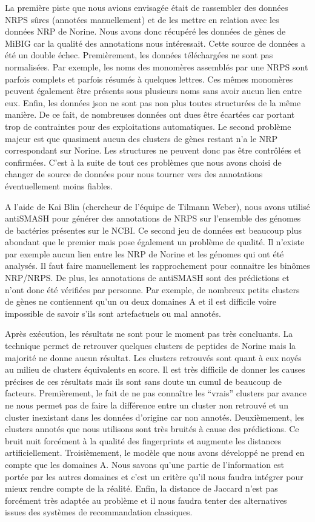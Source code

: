 La première piste que nous avions envisagée était de rassembler des données NRPS sûres (annotées manuellement) et de les mettre en relation avec les données NRP de Norine.
Nous avons donc récupéré les données de gènes de MiBIG car la qualité des annotations nous intéressait.
Cette source de données a été un double échec.
Premièrement, les données téléchargées ne sont pas normalisées.
Par exemple, les noms des monomères assemblés par une NRPS sont parfois complets et parfois résumés à quelques lettres.
Ces mêmes monomères peuvent également être présents sous plusieurs noms sans avoir aucun lien entre eux.
Enfin, les données json ne sont pas non plus toutes structurées de la même manière.
De ce fait, de nombreuses données ont dues être écartées car portant trop de contraintes pour des exploitations automatiques.
Le second problème majeur est que quasiment aucun des clusters de gènes restant n'a le NRP correspondant sur Norine.
Les structures ne peuvent donc pas être contrôlées et confirmées.
C'est à la suite de tout ces problèmes que nous avons choisi de changer de source de données pour nous tourner vers des annotations éventuellement moins fiables.

A l'aide de Kai Blin (chercheur de l'équipe de Tilmann Weber), nous avons utilisé antiSMASH pour générer des annotations de NRPS sur l'ensemble des génomes de bactéries présentes sur le NCBI.
Ce second jeu de données est beaucoup plus abondant que le premier mais pose également un problème de qualité.
Il n'existe par exemple aucun lien entre les NRP de Norine et les génomes qui ont été analysés.
Il faut faire manuellement les rapprochement pour connaitre les binômes NRP/NRPS.
De plus, les annotations de antiSMASH sont des prédictions et n'ont donc été vérifiées par personne.
Par exemple, de nombreux petits clusters de gènes ne contiennent qu'un ou deux domaines A et il est difficile voire impossible de savoir s'ils sont artefactuels ou mal annotés.

Après exécution, les résultats ne sont pour le moment pas très concluants.
La technique permet de retrouver quelques clusters de peptides de Norine mais la majorité ne donne aucun résultat.
Les clusters retrouvés sont quant à eux noyés au milieu de clusters équivalents en score.
Il est très difficile de donner les causes précises de ces résultats mais ils sont sans doute un cumul de beaucoup de facteurs.
Premièrement, le fait de ne pas connaître les ``vrais'' clusters par avance ne nous permet pas de faire la différence entre un cluster non retrouvé et un cluster inexistant dans les données d'origine car non annotés.
Deuxièmement, les clusters annotés que nous utilisons sont très bruités à cause des prédictions.
Ce bruit nuit forcément à la qualité des fingerprints et augmente les distances artificiellement.
Troisièmement, le modèle que nous avons développé ne prend en compte que les domaines A.
Nous savons qu'une partie de l'information est portée par les autres domaines et c'est un critère qu'il nous faudra intégrer pour mieux rendre compte de la réalité.
Enfin, la distance de Jaccard n'est pas forcément très adaptée au problème et il nous faudra tenter des alternatives issues des systèmes de recommandation classiques.


